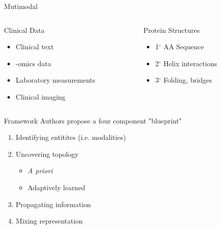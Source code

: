 \documentclass{beamer}
\begin{document}
\begin{frame}{Mutimodal}
    \begin{columns}[T]
        \begin{column}{0.5\textwidth}
            Clinical Data
            \begin{itemize}        
                \item Clinical text  
                \item -omics data 
                \item Laboratory measurements 
                \item Clinical imaging
            \end{itemize}
            \end{column}
        \begin{column}{0.5\textwidth}
            Protein Structures
            \begin{itemize}        
                \item 1$^\circ$ AA Sequence
                \item 2$^\circ$ Helix interactions
                \item 3$^\circ$ Folding, bridges 
            \end{itemize}
        \end{column}
    \end{columns}
\end{frame}


\begin{frame}{Framework}
    Authors propose a four component "blueprint"
    \begin{enumerate}
    \item Identifying entitites (i.e. modalities)
    \item Uncovering topology 
    \begin{itemize}
        \item {\it A priori}
        \item Adaptively learned
    \end{itemize}
    \item Propagating information 
    \item Mixing representation 
    \end{enumerate}
\end{frame}
\end{document}
